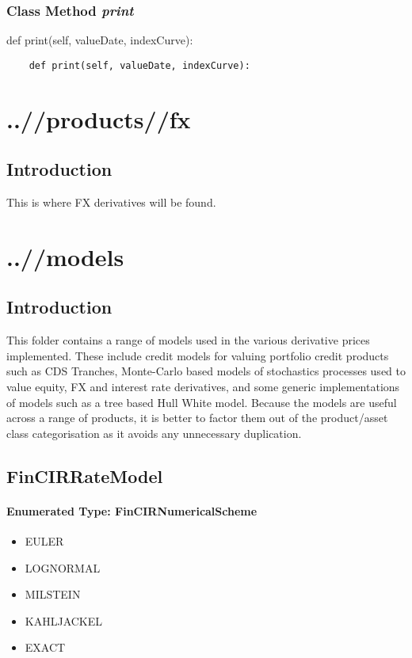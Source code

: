 \documentclass[twoside,11pt]{book}
\begin{document}
\subsection{Class Method {\it print}}
def print(self, valueDate, indexCurve):

\begin{lstlisting}
    def print(self, valueDate, indexCurve):
\end{lstlisting}


\chapter{..//products//fx}
\section{Introduction}
This is where FX derivatives will be found.

\chapter{..//models}
\section{Introduction}
This folder contains a range of models used in the various derivative prices implemented. These include credit models for valuing portfolio credit products such as CDS Tranches, Monte-Carlo based models of stochastics processes used to value equity, FX and interest rate derivatives, and some generic implementations of models such as a tree based Hull White model. Because the models are useful across a range of products, it is better to factor them out of the product/asset class categorisation as it avoids any unnecessary duplication.

\newpage
\section{FinCIRRateModel}

\subsubsection{Enumerated Type: FinCIRNumericalScheme}
\begin{itemize}
\item{EULER}
\item{LOGNORMAL}
\item{MILSTEIN}
\item{KAHLJACKEL}
\item{EXACT}
\end{itemize}
\end{document}
